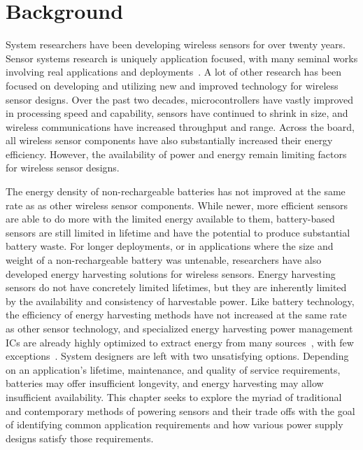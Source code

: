 \chapter{Background}
\label{chap:background}
System researchers have been developing wireless sensors for over twenty years.
Sensor systems research is uniquely application focused, with many seminal works involving real applications and deployments~\cite{juang2002energy,mainwaring2002wireless,tolle2005macroscope}.
A lot of other research has been focused on developing and utilizing new and improved technology for wireless sensor designs. 
Over the past two decades, microcontrollers have vastly improved in processing speed and capability, sensors have continued to shrink in size, and wireless communications have increased throughput and range.
Across the board, all wireless sensor components have also substantially increased their energy efficiency.
However, the availability of power and energy remain limiting factors for wireless sensor designs. 

The energy density of non-rechargeable batteries has not improved at the same rate as as other wireless sensor components. 
While newer, more efficient sensors are able to do more with the limited energy available to them, battery-based sensors are still limited in lifetime and have the potential to produce substantial battery waste.
For longer deployments, or in applications where the size and weight of a non-rechargeable battery was untenable, researchers have also developed energy harvesting solutions for wireless sensors. 
Energy harvesting sensors do not have concretely limited lifetimes, but they are inherently limited by the availability and consistency of harvestable power.
Like battery technology, the efficiency of energy harvesting methods have not increased at the same rate as other sensor technology, and specialized energy harvesting power management ICs are already highly optimized to extract energy from many sources~\cite{adp5091,bq25505,matrix_prometheus}, with few exceptions~\cite{josephson2020farming,marcano2022soil}.
System designers are left with two unsatisfying options. 
Depending on an application's lifetime, maintenance, and quality of service requirements, batteries may offer insufficient longevity, and energy harvesting may allow insufficient availability. 
This chapter seeks to explore the myriad of traditional and contemporary methods of powering sensors and their trade offs 
with the goal of identifying common application requirements and how various power supply designs satisfy those requirements.

